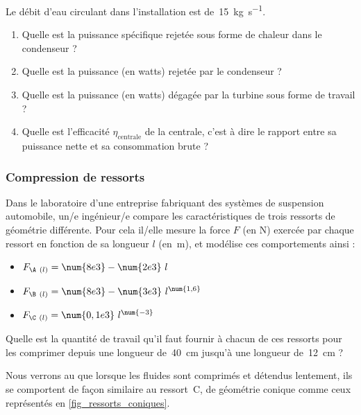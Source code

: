 	Le débit d’eau circulant dans l’installation est de~\SI{15}{\kilogram\per\second}.

	\begin{enumerate}
		\item Quelle est la puissance spécifique rejetée sous forme de chaleur dans le condenseur ?
		\item Quelle est la puissance (en \si{watts}) rejetée par le condenseur ?
		\item Quelle est la puissance (en \si{watts}) dégagée par la turbine sous forme de travail ?
		\item Quelle est l’efficacité $\eta_{\text{centrale}}$ de la centrale, c’est à dire le rapport entre sa puissance nette et sa consommation brute ?
	\end{enumerate}	

\subsubsection{Compression de ressorts}
\label{exo_compression_ressorts}
	
	Dans le laboratoire d’une entreprise fabriquant des systèmes de suspension automobile, un/e ingénieur/e compare les caractéristiques de trois ressorts de géométrie différente. Pour cela il/elle mesure la force $F$ (en \si{\newton}) exercée par chaque ressort en fonction de sa longueur $l$ (en~\si{\metre}), et modélise ces comportements ainsi :
	
		\begin{itemize}
			\item \onlyframabook{~~}$F_{\A\ (l)} = \num{8e3} - \num{2e3} \ l$ %
			\item \onlyframabook{~~}$F_{\B\ (l)} = \num{8e3} - \num{3e3} \ l^{\num{1,6}}$
			\item \onlyframabook{~~}$F_{\C\ (l)} = \num{0,1e3} \ l^{\num{-3}}$
		\end{itemize}
		
	Quelle est la quantité de travail qu’il faut fournir à chacun de ces ressorts pour les comprimer depuis une longueur de~\SI{40}{\centi\metre} jusqu’à une longueur de~\SI{12}{\centi\metre} ?
	
	Nous verrons au \coursdeux que lorsque les fluides sont comprimés et détendus lentement, ils se comportent de façon similaire au ressort~C, de géométrie conique comme ceux représentés en \cref{fig_ressorts_coniques}.
	
